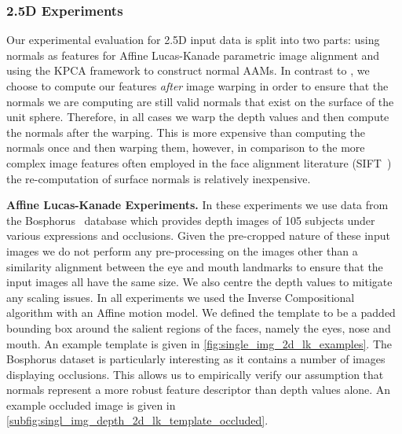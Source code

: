 \subsubsection{2.5D Experiments}\label{subsubsec:singl_img_2d_lk_experiments}
Our experimental evaluation for 2.5D input data is split into two parts: using
normals as features for Affine Lucas-Kanade parametric image alignment and
using the KPCA framework to construct normal AAMs. In contrast to
\citet{antonakos2015feature}, we choose to compute our features \textit{after}
image warping in order to ensure that the normals we are computing are still
valid normals that exist on the surface of the unit sphere. Therefore, in all
cases we warp the depth values and then compute the normals after the
warping. This is more expensive than computing the normals once and then
warping them, however, in comparison to the more complex image features
often employed in the face alignment literature
(\eg SIFT~\cite{lowe2004distinctive}) the re-computation of surface normals
is relatively inexpensive.

\textbf{Affine Lucas-Kanade Experiments.} In these experiments we use data
from the Bosphorus~\cite{Savran:2008gg} database which provides depth images
of 105 subjects under various expressions and occlusions. Given the pre-cropped
nature of these input images we do not perform any pre-processing on the
images other than a similarity alignment between the eye and mouth landmarks to
ensure that the input images all have the same size. We also centre the depth
values to mitigate any scaling issues. In all experiments we used the
Inverse Compositional algorithm with an Affine motion model.
We defined the template to be a padded
bounding box around the salient regions of the faces, namely the eyes, nose and
mouth. An example template is given in \cref{fig:single_img_2d_lk_examples}.
The Bosphorus dataset is particularly interesting as it contains a number of
images displaying occlusions. This allows us to empirically verify our assumption
that normals represent a more robust feature descriptor than depth values alone.
An example occluded image is given in
\cref{subfig:singl_img_depth_2d_lk_template_occluded}.

